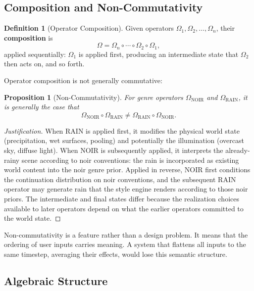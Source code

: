 \documentclass[11pt,a4paper]{article}
\theoremstyle{plain}
\newtheorem{proposition}[theorem]{Proposition}
\theoremstyle{definition}
\newtheorem{definition}[theorem]{Definition}
\theoremstyle{remark}
\begin{document}
\subsection{Composition and Non-Commutativity}

\begin{definition}[Operator Composition]
Given operators $\Omega_1, \Omega_2, \ldots, \Omega_n$, their \textbf{composition} is
\[
\Omega = \Omega_n \circ \cdots \circ \Omega_2 \circ \Omega_1,
\]
applied sequentially: $\Omega_1$ is applied first, producing an intermediate state that $\Omega_2$ then acts on, and so forth.
\end{definition}

Operator composition is not generally commutative:

\begin{proposition}[Non-Commutativity]
For genre operators $\Omega_{\mathrm{NOIR}}$ and $\Omega_{\mathrm{RAIN}}$, it is generally the case that
\[
\Omega_{\mathrm{NOIR}} \circ \Omega_{\mathrm{RAIN}} \neq \Omega_{\mathrm{RAIN}} \circ \Omega_{\mathrm{NOIR}}.
\]
\end{proposition}

\begin{proof}[Justification]
When \textsc{RAIN} is applied first, it modifies the physical world state (precipitation, wet surfaces, pooling) and potentially the illumination (overcast sky, diffuse light). When \textsc{NOIR} is subsequently applied, it interprets the already-rainy scene according to noir conventions: the rain is incorporated as existing world content into the noir genre prior. Applied in reverse, \textsc{NOIR} first conditions the continuation distribution on noir conventions, and the subsequent \textsc{RAIN} operator may generate rain that the style engine renders according to those noir priors. The intermediate and final states differ because the realization choices available to later operators depend on what the earlier operators committed to the world state.
\end{proof}

Non-commutativity is a feature rather than a design problem. It means that the ordering of user inputs carries meaning. A system that flattens all inputs to the same timestep, averaging their effects, would lose this semantic structure.

\subsection{Algebraic Structure}
\end{document}
